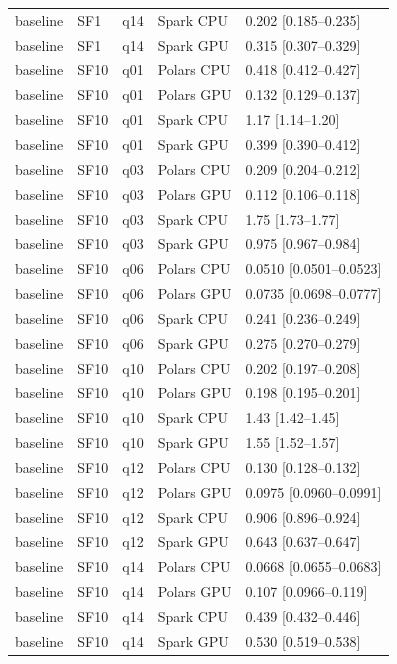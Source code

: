 \begin{longtable}{lllll}
baseline & SF1 & q14 & Spark CPU & 0.202 [0.185--0.235] \\
baseline & SF1 & q14 & Spark GPU & 0.315 [0.307--0.329] \\
baseline & SF10 & q01 & Polars CPU & 0.418 [0.412--0.427] \\
baseline & SF10 & q01 & Polars GPU & 0.132 [0.129--0.137] \\
baseline & SF10 & q01 & Spark CPU & 1.17 [1.14--1.20] \\
baseline & SF10 & q01 & Spark GPU & 0.399 [0.390--0.412] \\
baseline & SF10 & q03 & Polars CPU & 0.209 [0.204--0.212] \\
baseline & SF10 & q03 & Polars GPU & 0.112 [0.106--0.118] \\
baseline & SF10 & q03 & Spark CPU & 1.75 [1.73--1.77] \\
baseline & SF10 & q03 & Spark GPU & 0.975 [0.967--0.984] \\
baseline & SF10 & q06 & Polars CPU & 0.0510 [0.0501--0.0523] \\
baseline & SF10 & q06 & Polars GPU & 0.0735 [0.0698--0.0777] \\
baseline & SF10 & q06 & Spark CPU & 0.241 [0.236--0.249] \\
baseline & SF10 & q06 & Spark GPU & 0.275 [0.270--0.279] \\
baseline & SF10 & q10 & Polars CPU & 0.202 [0.197--0.208] \\
baseline & SF10 & q10 & Polars GPU & 0.198 [0.195--0.201] \\
baseline & SF10 & q10 & Spark CPU & 1.43 [1.42--1.45] \\
baseline & SF10 & q10 & Spark GPU & 1.55 [1.52--1.57] \\
baseline & SF10 & q12 & Polars CPU & 0.130 [0.128--0.132] \\
baseline & SF10 & q12 & Polars GPU & 0.0975 [0.0960--0.0991] \\
baseline & SF10 & q12 & Spark CPU & 0.906 [0.896--0.924] \\
baseline & SF10 & q12 & Spark GPU & 0.643 [0.637--0.647] \\
baseline & SF10 & q14 & Polars CPU & 0.0668 [0.0655--0.0683] \\
baseline & SF10 & q14 & Polars GPU & 0.107 [0.0966--0.119] \\
baseline & SF10 & q14 & Spark CPU & 0.439 [0.432--0.446] \\
baseline & SF10 & q14 & Spark GPU & 0.530 [0.519--0.538] \\

\end{longtable}
